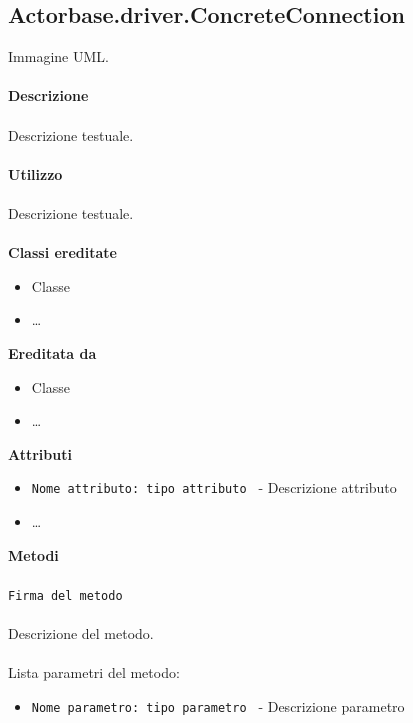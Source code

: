\documentclass[a4paper]{article}
\begin{document}
	\subsection{Actorbase.driver.ConcreteConnection}	
		Immagine UML.
		\\ \\
		\textbf{Descrizione}
			\\ \\
			Descrizione testuale.
			\\ \\
		\textbf{Utilizzo}
			\\ \\
			Descrizione testuale.
			\\ \\
		\textbf{Classi ereditate}
			\begin{itemize}
				\item Classe
				\item \dots
			\end{itemize}
		\textbf{Ereditata da}
			\begin{itemize}
				\item Classe
				\item \dots
			\end{itemize}
		\textbf{Attributi}
			\begin{itemize}
				\item \texttt{Nome attributo: tipo attributo } - Descrizione attributo
				\item \dots
			\end{itemize}
		\textbf{Metodi}
			\\ \\
			\texttt{Firma del metodo}
			\\ \\
			Descrizione del metodo.
			\\ \\
			Lista parametri del metodo:
			\begin{itemize}
				\item \texttt{Nome parametro: tipo parametro } - Descrizione parametro
			\end{itemize}
			
\end{document}
